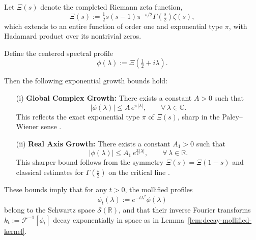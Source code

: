 \begin{lemma}
\label{lem:xi_growth_bound}
Let \( \Xi(s) \) denote the completed Riemann zeta function,
\[
\Xi(s) := \tfrac{1}{2} s(s-1) \pi^{-s/2} \Gamma\left(\tfrac{s}{2}\right) \zeta(s),
\]
which extends to an entire function of order one and exponential type \( \pi \), with Hadamard product over its nontrivial zeros.

Define the centered spectral profile
\[
\phi(\lambda) := \Xi\left( \tfrac{1}{2} + i\lambda \right).
\]

Then the following exponential growth bounds hold:
\begin{itemize}
    \item[\textup{(i)}] \textbf{Global Complex Growth:} There exists a constant \( A > 0 \) such that
    \[
    |\phi(\lambda)| \le A\, e^{\pi |\lambda|}, \qquad \forall\, \lambda \in \mathbb{C}.
    \]
    This reflects the exact exponential type \( \pi \) of \( \Xi(s) \), sharp in the Paley–Wiener sense \cite[Thm.~3.7.1]{Levin1996EntireLectures}.

    \item[\textup{(ii)}] \textbf{Real Axis Growth:} There exists a constant \( A_1 > 0 \) such that
    \[
    |\phi(\lambda)| \le A_1\, e^{\tfrac{\pi}{2} |\lambda|}, \qquad \forall\, \lambda \in \mathbb{R}.
    \]
    This sharper bound follows from the symmetry \( \Xi(s) = \Xi(1 - s) \) and classical estimates for \( \Gamma(\tfrac{s}{2}) \) on the critical line \cite[§4.12]{Titchmarsh1986Zeta}.
\end{itemize}

\noindent
These bounds imply that for any \( t > 0 \), the mollified profiles
\[
\phi_t(\lambda) := e^{-t\lambda^2} \phi(\lambda)
\]
belong to the Schwartz space \( \mathcal{S}(\mathbb{R}) \), and that their inverse Fourier transforms \( k_t := \mathscr{F}^{-1}[\phi_t] \) decay exponentially in space as in Lemma~\ref{lem:decay-mollified-kernel}.
\end{lemma}
